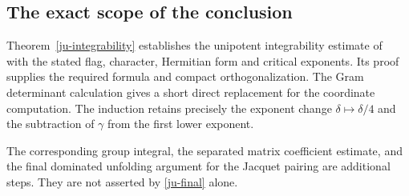 \subsection{The exact scope of the conclusion}

Theorem~\ref{ju-integrability} establishes the unipotent
integrability estimate of~\cite{alpo-uniform-source} with the
stated flag, character, Hermitian form and critical exponents.
Its proof supplies the required formula and compact
orthogonalization.  The Gram determinant calculation gives a
short direct replacement for the coordinate computation.
The induction retains precisely the exponent change
\(\delta\mapsto\delta/4\) and the subtraction of \(\gamma\)
from the first lower exponent.

The corresponding group integral, the separated
matrix coefficient estimate, and the final dominated
unfolding argument for the Jacquet pairing are additional
steps.  They are not asserted by \eqref{ju-final} alone.


